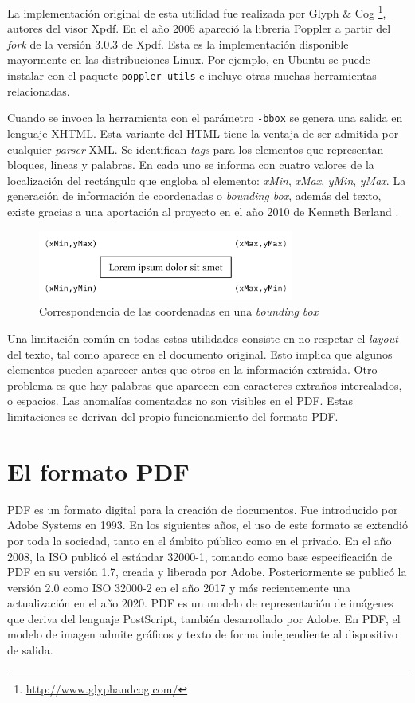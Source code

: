 La implementación original de esta utilidad fue realizada por Glyph \& Cog \footnote{\url{http://www.glyphandcog.com/}}, autores del visor Xpdf. En el año 2005 apareció la librería Poppler a partir del \emph{fork} de la versión 3.0.3 de Xpdf. Esta es la implementación disponible mayormente en las distribuciones Linux. Por ejemplo, en Ubuntu se puede instalar con el paquete \verb|poppler-utils| e incluye otras muchas herramientas relacionadas.

Cuando se invoca la herramienta con el parámetro \verb|-bbox| se genera una salida en lenguaje XHTML. Esta variante del HTML tiene la ventaja de ser admitida por cualquier \emph{parser} XML. Se identifican \emph{tags} para los elementos que representan bloques, lineas y palabras. En cada uno se informa con cuatro valores de la localización del rectángulo que engloba al elemento: \emph{xMin}, \emph{xMax}, \emph{yMin}, \emph{yMax}. La generación de información de coordenadas o \emph{bounding box}, además del texto, existe gracias a una aportación al proyecto en el año 2010 de Kenneth Berland \cite{berland_mail_addingCoordinates}. 

\begin{figure}[hp!]
    \centering
    \includegraphics[width=0.75\textwidth]{imaxes/c-bases-teoricas/correspondencia-coordenadas-bounding.png}
    \caption{Correspondencia de las coordenadas en una \emph{bounding box}}
    \label{fig:bounding-box}
\end{figure}

Una limitación común en todas estas utilidades consiste en no respetar el \emph{layout} del texto, tal como aparece en el documento original. Esto implica que algunos elementos pueden aparecer antes que otros en la información extraída. Otro problema es que hay palabras que aparecen con caracteres extraños intercalados, o espacios. Las anomalías comentadas no son visibles en el PDF. Estas limitaciones se derivan del propio funcionamiento del formato PDF.

\section{El formato PDF}

PDF es un formato digital para la creación de documentos. Fue introducido por Adobe Systems en 1993. En los siguientes años, el uso de este formato se extendió por toda la sociedad, tanto en el ámbito público como en el privado. En el año 2008, la ISO publicó el estándar 32000-1, tomando como base especificación de PDF en su versión 1.7, creada y liberada por Adobe. Posteriormente se publicó la versión 2.0 como ISO 32000-2 en el año 2017 y más recientemente una actualización en el año 2020. PDF es un modelo de representación de imágenes que deriva del lenguaje PostScript, también desarrollado por Adobe. En PDF, el modelo de imagen admite gráficos y texto de forma independiente al dispositivo de salida. 

